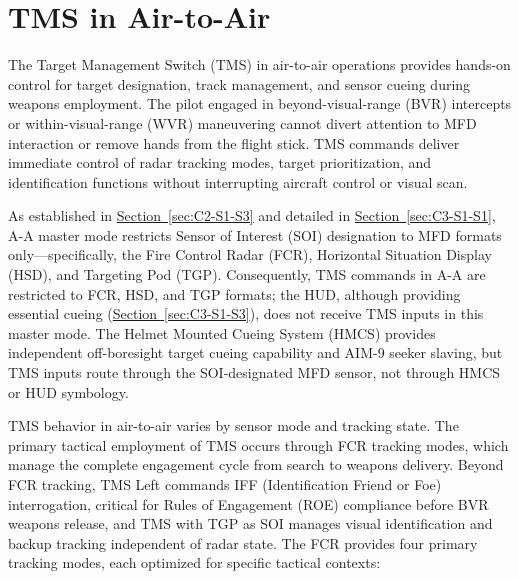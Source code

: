 \documentclass[11pt, a4paper, twoside]{report}
\newcommand{\secref}[1]{\hyperref[#1]{Section~\ref*{#1}}}
\begin{document}
\section{TMS in Air-to-Air}
\label{sec:C4-S3}

The Target Management Switch (TMS) in air-to-air operations provides hands-on control for target designation, track management, and sensor cueing during weapons employment. The pilot engaged in beyond-visual-range (BVR) intercepts or within-visual-range (WVR) maneuvering cannot divert attention to MFD interaction or remove hands from the flight stick. TMS commands deliver immediate control of radar tracking modes, target prioritization, and identification functions without interrupting aircraft control or visual scan.

As established in \secref{sec:C2-S1-S3} and detailed in \secref{sec:C3-S1-S1}, A-A master mode restricts Sensor of Interest (SOI) designation to MFD formats only—specifically, the Fire Control Radar (FCR), Horizontal Situation Display (HSD), and Targeting Pod (TGP). Consequently, TMS commands in A-A are restricted to FCR, HSD, and TGP formats; the HUD, although providing essential cueing (\secref{sec:C3-S1-S3}), does not receive TMS inputs in this master mode. The Helmet Mounted Cueing System (HMCS) provides independent off-boresight target cueing capability and AIM-9 seeker slaving, but TMS inputs route through the SOI-designated MFD sensor, not through HMCS or HUD symbology.

TMS behavior in air-to-air varies by sensor mode and tracking state. The primary tactical employment of TMS occurs through FCR tracking modes, which manage the complete engagement cycle from search to weapons delivery. Beyond FCR tracking, TMS Left commands IFF (Identification Friend or Foe) interrogation, critical for Rules of Engagement (ROE) compliance before BVR weapons release, and TMS with TGP as SOI manages visual identification and backup tracking independent of radar state. The FCR provides four primary tracking modes, each optimized for specific tactical contexts:
\end{document}
